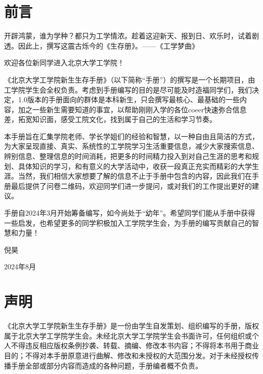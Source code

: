 \documentclass[11pt,oneside]{book}
\begin{document}
\chapter*{前言}
开辟鸿蒙，谁为学种？都只为工学情浓。趁着这迎新天、报到日、欢乐时，试着剧透。因此上，撰写这震古烁今的《生存册》。——《工学梦曲》

\vspace{10pt}

欢迎各位新同学进入北京大学工学院！

\vspace{10pt}

《北京大学工学院新生生存手册》（以下简称“手册”）的撰写是一个长期项目，由工学院学生会全权负责。考虑到手册编写的目的是尽可能及时造福同学们，我们决定，1.0版本的手册面向的群体是本科新生，只会撰写最核心、最基础的一些内容，加之一些新生需要知道的事宜，以帮助刚刚入学的各位coeer快速弥合信息差，拓宽知识面，感受工院文化，找到属于自己的生活和学习节奏。

\vspace{10pt}

本手册旨在汇集学院老师、学长学姐们的经验和智慧，以一种自由且简洁的方式，为大家呈现直接、真实、系统性的工学院学习生活重要信息，减少大家搜索信息、辨别信息、整理信息的时间消耗，把更多的时间精力投入到对自己生涯的思考和规划、具体知识的学习，和有意义的大学活动中，收获一段真正充实而精彩的大学生涯。当然，我们相信大家想要了解的信息不止于手册中包含的内容，因此我们在手册最后提供了问卷二维码，欢迎同学们进一步提问，或对我们的工作提出更好的建议。

\vspace{10pt}

手册自2024年3月开始筹备编写，如今尚处于“幼年”。希望同学们能从手册中获得一些启发，也希望更多的同学积极加入工学院学生会，为手册的编写贡献自己的智慧和力量！
\begin{flushright}
	倪昊
	
	2024年8月
\end{flushright}

\chapter*{声明}

《北京大学工学院新生生存手册》是一份由学生自发策划、组织编写的手册，版权属于北京大学工学院学生会。未经北京大学工学院学生会书面许可，任何组织或个人不得违反相应版权条例抄袭、转载、摘编、修改本书内容；不得将本书用于商业目的；不得对本手册原意进行曲解、修改和未授权的大范围分发。对于未经授权传播手册全部或部分内容而造成的各种问题，手册编者概不负责。
\end{document}
